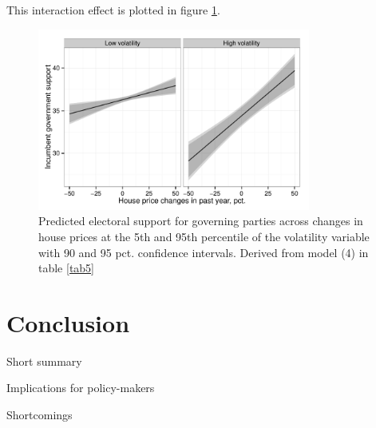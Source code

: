 \documentclass[12pt,a4paper]{article}
\begin{document}


This interaction effect is plotted in figure \ref{vola}.

\begin{figure}[htbp]
	\includegraphics[page=1,width=0.8\textwidth]{../figures/volaplot}
	\centering
	\caption{Predicted electoral support for governing parties across changes in house prices at the 5th and 95th percentile of the volatility variable with 90 and 95 pct. confidence intervals. Derived from model (4) in table \ref{tab5}}
	\label{vola}
\end{figure}






\section{Conclusion}
Short summary

Implications for policy-makers

Shortcomings









\clearpage

\singlespacing



\end{document}
